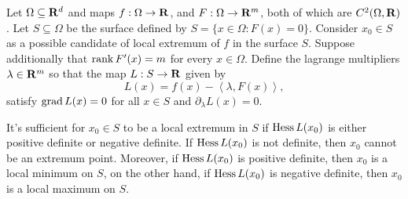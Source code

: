 \begin{theorem}
  \label{thm:sufficient-extremum}
  Let \(\Omega \subseteq \mathbf{R}^d\) and maps \(f: \Omega \to \mathbf{R}\), and  \(F: \Omega \to \mathbf{R}^m\), both of which
  are \(C^2(\Omega, \mathbf{R})\). Let \(S \subseteq \Omega\) be the surface defined by \(S = \{x \in \Omega :
  F(x) = 0\}\). Consider \(x_0 \in S\) as a possible candidate of local extremum
  of \(f\) in the surface \(S\). Suppose additionally that \(\operatorname{rank} F'(x) =
  m\) for every \(x \in \Omega\). Define the lagrange multipliers \(\lambda \in \mathbf{R}^m\) so that
  the map \(L: S \to \mathbf{R}\) given by
  \[
    L(x) = f(x) - \left\langle \lambda, F(x) \right\rangle,
  \]
  satisfy \(\operatorname{grad} L(x) = 0\) for all \(x \in S\) and \(\partial_{\lambda} L(x) = 0\).

  It's sufficient for \(x_0 \in S\) to be a local extremum in \(S\) if \(\operatorname{Hess}
  L(x_0)\) is either positive definite or negative definite. If \(\operatorname{Hess} L(x_0)\)
  is not definite, then \(x_0\) cannot be an extremum point. Moreover, if \(\operatorname{Hess}
  L(x_0)\) is positive definite, then \(x_0\) is a local minimum on \(S\), on the
  other hand, if \(\operatorname{Hess} L(x_0)\) is negative definite, then \(x_0\) is a local
  maximum on \(S\).
\end{theorem}

